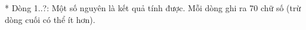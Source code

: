 * Dòng 1..?: Một số nguyên là kết quả tính được.  Mỗi dòng ghi ra 70 chữ số (trừ dòng cuối có thể ít hơn).